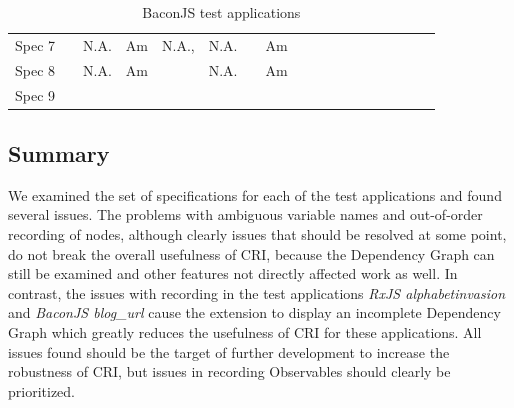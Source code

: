 \begin{table}[]
{\begin{tabular}{llllllllllllllllll}
		Spec 7 & \myes         & N.A.       & Am       & N.A.,\myes & N.A.       & \myes                                 & Am                   & \myes                 & \myes               & \myes               & \myes            & \myes         & \myes                   & \myes                & \myes                 & \myes       & \myes \\
		Spec 8 & \myes         & N.A.       & Am       & \myes      & N.A.       & \mno                                 & Am                   & \myes                 & \myes               & \myes               & \myes            & \mno         & \myes                   & \myes                & \myes                 & \myes       & \myes \\
		Spec 9 & \myes         & \myes         & \myes        & \myes      & \myes         & \myes                                 & \myes                    & \myes                 & \myes               & \myes               & \myes            & \myes         & \myes                   & \myes                & \myes                 & \myes       & \myes
	\end{tabular}%
}
\caption{BaconJS test applications}
\label{tab:BaconJS}
\end{table}

\subsection{Summary}
We examined the set of specifications for each of the test applications and found several issues. The problems with ambiguous variable names and out-of-order recording of nodes, although clearly issues that should be resolved at some point, do not break the overall usefulness of CRI, because the Dependency Graph can still be examined and other features not directly affected work as well. In contrast, the issues with recording in the test applications \emph{RxJS alphabetinvasion} and \emph{BaconJS blog\_url} cause the extension to display an incomplete Dependency Graph which greatly reduces the usefulness of CRI for these applications.
All issues found should be the target of further development to increase the robustness of CRI, but issues in recording Observables should clearly be prioritized.